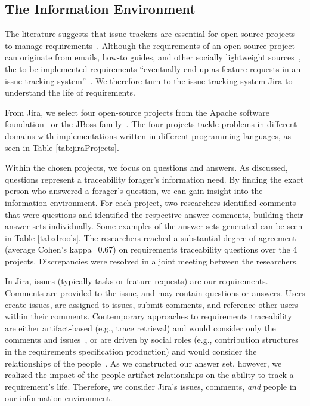 \documentclass[conference]{IEEEtran}
\begin{document}
\subsection{The Information Environment}
The literature suggests that issue trackers are essential for open-source projects to manage requirements~\cite{ICSE5,ICSE25,ICSE33,ICSE40,ICSE60}. Although the requirements of an open-source project can originate from emails, how-to guides, and other socially lightweight sources~\cite{ICSE62}, the to-be-implemented requirements ``eventually end up as feature requests in an issue-tracking system''~\cite{ICSE33}. We therefore turn to the issue-tracking system Jira to understand the life of requirements.

From Jira, we select four open-source projects from the Apache software foundation~\cite{ICSE7} or the JBoss family~\cite{ICSE38}.
The four projects tackle problems in different domains with implementations written in different programming languages, as seen in Table \ref{tab:jiraProjects}.

Within the chosen projects, we focus on questions and answers. As discussed, questions represent a traceability forager's information need. By finding the exact person who answered a forager's question, we can gain insight into the information environment. For each project, two researchers identified comments that were questions and identified the respective answer comments, building their answer sets individually. Some examples of the answer sets generated can be seen in Table \ref{tab:drools}. The researchers reached a substantial degree of agreement (average Cohen's kappa=0.67) on requirements traceability questions over the 4 projects. Discrepancies were resolved in a joint meeting between the researchers. 

In Jira, issues (typically tasks or feature requests) are our requirements. Comments are provided to the issue, and may contain questions or answers. Users create issues, are assigned to issues, submit comments, and reference other users within their comments. Contemporary approaches to requirements traceability are either artifact-based (e.g., trace retrieval) and would consider only the comments and issues~\cite{ICSE15}, or are driven by social roles (e.g., contribution structures in the requirements specification production) and would consider the relationships of the people~\cite{ICSE29}. As we constructed our answer set, however, we realized the impact of the people-artifact relationships on the ability to track a requirement's life. Therefore, we consider Jira's issues, comments, \textit{and} people in our information environment.
\end{document}
